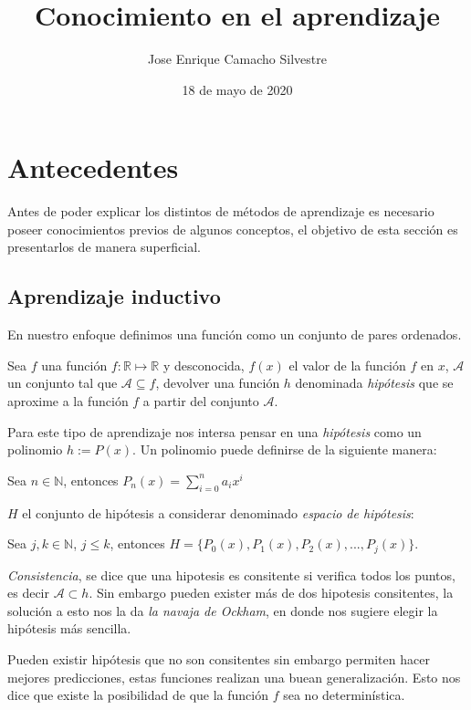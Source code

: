 \documentclass[12 pt, a4paper]{article}
\title{Conocimiento en el aprendizaje}
\author{Jose Enrique Camacho Silvestre}
\date{18 de mayo de 2020}
\begin{document}
	\maketitle
	\section{Antecedentes}
	Antes de poder explicar los distintos de métodos de aprendizaje es necesario poseer conocimientos previos de algunos conceptos, el objetivo de esta sección es presentarlos de manera superficial.
		\subsection{Aprendizaje inductivo}
			En nuestro enfoque definimos una función como un conjunto de pares ordenados.
			
			Sea \(f\) una función \(f: \mathbb{R} \mapsto \mathbb{R} \) y desconocida, \(f(x)\) el valor de la función \(f\) en \(x\), \(\mathcal{A}\) un conjunto tal que \(\mathcal{A} \subseteq f\),  devolver una función \(h\) denominada \emph{hipótesis} que se aproxime a la función \(f\) a partir del conjunto \(\mathcal{A}\). 
			
			Para este tipo de aprendizaje nos intersa pensar en una \emph{hipótesis} como un polinomio \(h := P(x)\). Un polinomio puede definirse de la siguiente manera:
			
			\begin{center}
				Sea \( n \in \mathbb{N}\), entonces \(P_{n}(x) =  \sum_{i = 0}^{n} a_{i}x^{i}\)
			\end{center}				
			\(H\) el conjunto de hipótesis a considerar denominado \emph{espacio de hipótesis}: 

			\begin{center}
				Sea \(j, k \in \mathbb{N}\),  \(j\leq k\), entonces \(H = \{ P_{0}(x), P_{1}(x), P_{2}(x), ... , P_{j}(x) \}\). 
			\end{center}
			
			\emph{Consistencia}, se dice que una hipotesis es consitente si verifica todos los puntos, es decir \(\mathcal{A} \subset h\). Sin embargo pueden exister más de dos hipotesis consitentes, la solución a esto nos la da \emph{la navaja de Ockham}, en donde nos sugiere elegir la hipótesis más sencilla.
			
			Pueden existir hipótesis que no son consitentes sin embargo permiten hacer mejores predicciones, estas funciones realizan una buean generalización. Esto nos dice que existe la posibilidad de que la función \(f\) sea no determinística.
			
\end{document}
